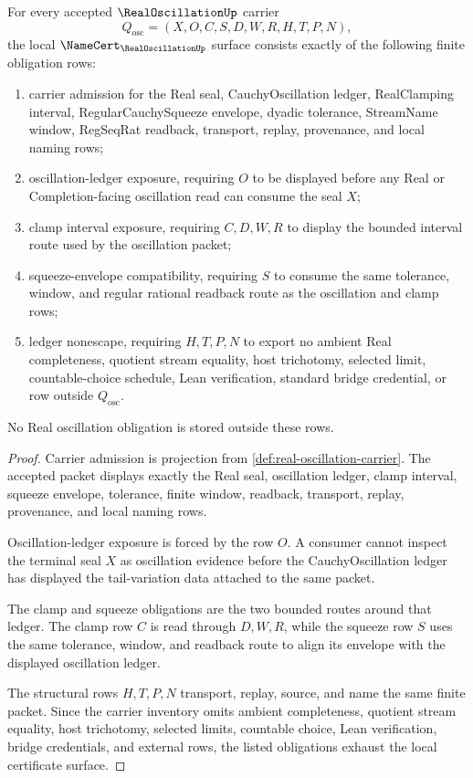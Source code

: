 \begin{theorem}
\label{thm:real-oscillation-namecert-obligations}
For every accepted $\RealOscillationUp$ carrier
$$
Q_{\mathrm{osc}}=(X,O,C,S,D,W,R,H,T,P,N),
$$
the local $\NameCert_{\RealOscillationUp}$ surface consists exactly of the following finite obligation rows:
\begin{enumerate}
\item carrier admission for the Real seal, CauchyOscillation ledger, RealClamping interval, RegularCauchySqueeze envelope, dyadic tolerance, StreamName window, RegSeqRat readback, transport, replay, provenance, and local naming rows;
\item oscillation-ledger exposure, requiring $O$ to be displayed before any Real or Completion-facing oscillation read can consume the seal $X$;
\item clamp interval exposure, requiring $C,D,W,R$ to display the bounded interval route used by the oscillation packet;
\item squeeze-envelope compatibility, requiring $S$ to consume the same tolerance, window, and regular rational readback route as the oscillation and clamp rows;
\item ledger nonescape, requiring $H,T,P,N$ to export no ambient Real completeness, quotient stream equality, host trichotomy, selected limit, countable-choice schedule, Lean verification, standard bridge credential, or row outside $Q_{\mathrm{osc}}$.
\end{enumerate}
No Real oscillation obligation is stored outside these rows.
\end{theorem}
\begin{proof}
Carrier admission is projection from \autoref{def:real-oscillation-carrier}. The accepted packet displays exactly the Real seal, oscillation ledger, clamp interval, squeeze envelope, tolerance, finite window, readback, transport, replay, provenance, and local naming rows.

Oscillation-ledger exposure is forced by the row $O$. A consumer cannot inspect the terminal seal $X$ as oscillation evidence before the CauchyOscillation ledger has displayed the tail-variation data attached to the same packet.

The clamp and squeeze obligations are the two bounded routes around that ledger. The clamp row $C$ is read through $D,W,R$, while the squeeze row $S$ uses the same tolerance, window, and readback route to align its envelope with the displayed oscillation ledger.

The structural rows $H,T,P,N$ transport, replay, source, and name the same finite packet. Since the carrier inventory omits ambient completeness, quotient stream equality, host trichotomy, selected limits, countable choice, Lean verification, bridge credentials, and external rows, the listed obligations exhaust the local certificate surface.
\end{proof}

